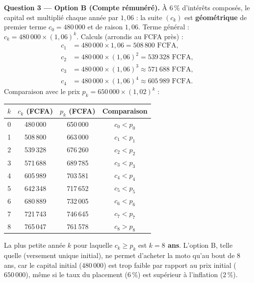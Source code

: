 \documentclass[11pt]{article}
\begin{document}
\begin{exoresolu}
\textbf{Question 3 — Option B (Compte rémunéré).}
À $6\,\%$ d'intérêts composés, le capital est multiplié chaque année par $1{,}06$ : la suite $(c_k)$ est \textbf{géométrique} de premier terme $c_0 = 480\,000$ et de raison $1{,}06$.
Terme général : $c_k = 480\,000 \times (1{,}06)^k$.
Calculs (arrondis au FCFA près) :
\begin{align*}
c_1 &= 480\,000 \times 1{,}06 = 508\,800 \text{ FCFA},\\
c_2 &= 480\,000 \times (1{,}06)^2 = 539\,328 \text{ FCFA},\\
c_3 &= 480\,000 \times (1{,}06)^3 \approx 571\,688 \text{ FCFA},\\
c_4 &= 480\,000 \times (1{,}06)^4 \approx 605\,989 \text{ FCFA}.
\end{align*}
Comparaison avec le prix $p_k = 650\,000 \times (1{,}02)^k$ :
\begin{center}
\begin{tabular}{|c|c|c|c|}\hline
$k$ & $c_k$ (FCFA) & $p_k$ (FCFA) & Comparaison \\ \hline
0 & 480\,000 & 650\,000 & $c_0 < p_0$ \\ \hline
1 & 508\,800 & 663\,000 & $c_1 < p_1$ \\ \hline
2 & 539\,328 & 676\,260 & $c_2 < p_2$ \\ \hline
3 & 571\,688 & 689\,785 & $c_3 < p_3$ \\ \hline
4 & 605\,989 & 703\,581 & $c_4 < p_4$ \\ \hline
5 & 642\,348 & 717\,652 & $c_5 < p_5$ \\ \hline
6 & 680\,889 & 732\,005 & $c_6 < p_6$ \\ \hline
7 & 721\,743 & 746\,645 & $c_7 < p_7$ \\ \hline
8 & 765\,047 & 761\,578 & $c_8 > p_8$ \\ \hline
\end{tabular}
\end{center}
La plus petite année $k$ pour laquelle $c_k \geq p_k$ est \textbf{$k = 8$ ans}.
L'option B, telle quelle (versement unique initial), ne permet d'acheter la moto qu'au bout de 8 ans, car le capital initial ($480\,000$) est trop faible par rapport au prix initial ($650\,000$), même si le taux du placement ($6\,\%$) est supérieur à l'inflation ($2\,\%$).


\end{exoresolu}
\end{document}
